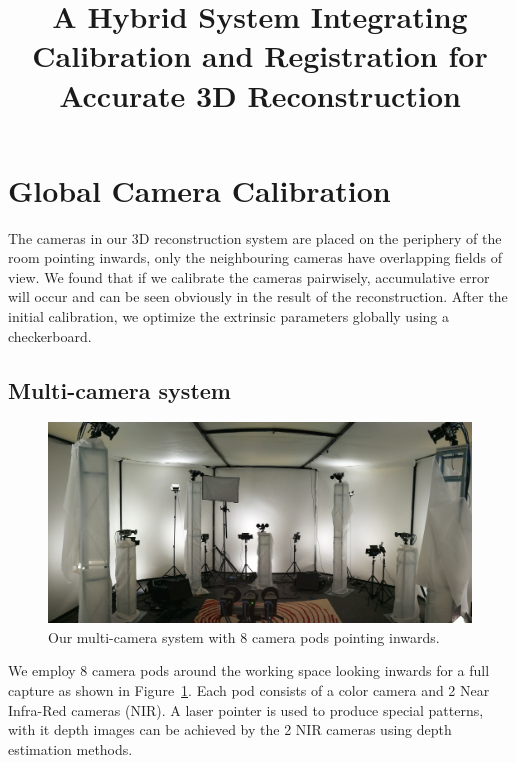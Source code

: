 \documentclass{article}
\begin{document}
\sloppy

\def\x{{\mathbf x}}
\def\L{{\cal L}}


\title{A Hybrid System Integrating Calibration and Registration for Accurate 3D Reconstruction}
%
\address{University of Science and Technology of China}


\maketitle



\section{Global Camera Calibration}
The cameras in our 3D reconstruction system are placed on the periphery of the room pointing inwards, only the neighbouring cameras have overlapping fields of view. We found that if we calibrate the cameras pairwisely, accumulative error will occur and can be seen obviously in the result of the reconstruction. After the initial calibration, we optimize the extrinsic parameters globally using a checkerboard.

\subsection{Multi-camera system}
\begin{figure}[ht]
\centering
\includegraphics[scale=0.08]{image/rig.jpg}
\caption{Our multi-camera system with 8 camera pods pointing inwards.}
\label{fig:rig}
\end{figure}

We employ 8 camera pods around the working space looking inwards for a full capture as shown in Figure~\ref{fig:rig}. Each pod consists of a color camera and 2 Near Infra-Red cameras (NIR). A laser pointer is used to produce special patterns, with it depth images can be achieved by the 2 NIR cameras using depth estimation methods.
\end{document}
